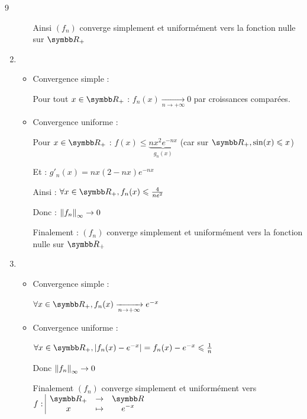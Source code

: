 \begin{correction}{9}
\begin{enumerate}
\begin{itemize}
        Ainsi $(f_n)$ converge simplement et uniformément vers la fonction nulle sur $\R_+$
    \end{itemize}

    \item~
    \begin{itemize}
        \item Convergence simple :

        Pour tout $x\in\R_+$ : $ f_n(x)\xrightarrow[n\to+\infty]{} 0$ par croissances comparées.
        
        \item Convergence uniforme :

        Pour $x\in\R_+$ : $f(x) \leqslant \underbrace{nx^2e^{-nx}}_{g_n(x)} $  (car sur $\R_+, \sin(x) \leqslant x$)

        Et : $g'_n(x) = nx(2-nx)e^{-nx}$


        Ainsi : $\forall x\in\R_+, f_n(x) \leqslant \frac{4}{ne^2}$

        Donc : $\left\|f_n\right\|_\infty \to 0$        


        Finalement : $(f_n)$ converge simplement et uniformément vers la fonction nulle sur $\R_+$
    \end{itemize}
    
    \item~
    \begin{itemize}
        \item Convergence simple :

        $\forall x\in\R_+, f_n(x)\xrightarrow[n\to+\infty]{} e^{-x}$
        \item Convergence uniforme :

        $\forall x\in\R_+, \abs{f_n(x)-e^{-x}} = f_n(x)-e^{-x} \leqslant \frac{1}{n}$

        Donc $\left\|f_n\right\|_\infty \to 0$

        Finalement $(f_n)$ converge simplement et uniformément vers $\fonction{f}{\R_+}{\R}{x}{e^{-x}}$
    \end{itemize}
\end{enumerate}    
\end{correction}

